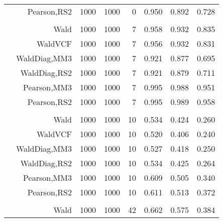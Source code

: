 \documentclass[
]{article}
\begin{document}
\begin{table}[H]
{\begin{tabular}[t]{lrrrrrrr}
\hspace{1em} & Pearson,RS2 & 1000 & 1000 & 0 & 0.950 & 0.892 & 0.728\\
\cmidrule{1-8}
\addlinespace[0.3em]
\multicolumn{8}{l}{\textbf{1F 15V}}\\
\hspace{1em} & Wald & 1000 & 1000 & 7 & 0.958 & 0.932 & 0.835\\

\hspace{1em} & WaldVCF & 1000 & 1000 & 7 & 0.956 & 0.932 & 0.831\\

\hspace{1em} & WaldDiag,MM3 & 1000 & 1000 & 7 & 0.921 & 0.877 & 0.695\\

\hspace{1em} & WaldDiag,RS2 & 1000 & 1000 & 7 & 0.921 & 0.879 & 0.711\\

\hspace{1em} & Pearson,MM3 & 1000 & 1000 & 7 & 0.995 & 0.988 & 0.951\\

\hspace{1em} & Pearson,RS2 & 1000 & 1000 & 7 & 0.995 & 0.989 & 0.958\\
\cmidrule{1-8}
\addlinespace[0.3em]
\multicolumn{8}{l}{\textbf{2F 10V}}\\
\hspace{1em} & Wald & 1000 & 1000 & 10 & 0.534 & 0.424 & 0.260\\

\hspace{1em} & WaldVCF & 1000 & 1000 & 10 & 0.520 & 0.406 & 0.240\\

\hspace{1em} & WaldDiag,MM3 & 1000 & 1000 & 10 & 0.527 & 0.418 & 0.250\\

\hspace{1em} & WaldDiag,RS2 & 1000 & 1000 & 10 & 0.534 & 0.425 & 0.264\\

\hspace{1em} & Pearson,MM3 & 1000 & 1000 & 10 & 0.609 & 0.505 & 0.340\\

\hspace{1em} & Pearson,RS2 & 1000 & 1000 & 10 & 0.611 & 0.513 & 0.372\\
\cmidrule{1-8}
\addlinespace[0.3em]
\multicolumn{8}{l}{\textbf{3F 15V}}\\
\hspace{1em} & Wald & 1000 & 1000 & 42 & 0.662 & 0.575 & 0.384\\


\end{tabular}}
\end{table}
\end{document}
